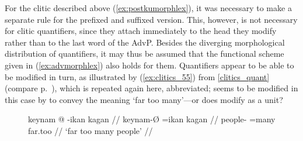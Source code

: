 For the clitic  described above (\ref{ex:postkumorphlex}),
it was necessary to make a separate rule for the prefixed and suffixed version.
This, however, is not necessary for clitic quantifiers, since they attach
immediately to the head they modify rather than to the last word of the AdvP.
Besides the diverging morphological distribution of quantifiers, it may thus be
assumed that the functional scheme given in (\ref{ex:advmorphlex}) also holds
for them. Quantifiers appear to be able to be modified in turn, as illustrated
by (\ref{ex:clitics_55}) from \autoref{clitics_quant} (compare
p.~\pageref{ex:clitics_55}), which is repeated again here, abbreviated;
 seems to be modified in this case by
 to convey the meaning `far too many'---or does
 modify  as a unit?

\begin{figure}[h]
\ex\label{ex:clitics_55_short}%
\begingl
	\gla keynam @ -ikan kagan //
	\glb keynam-Ø =ikan kagan //
	\glc people-\Top{} =many far.too //
	\glft `far too many people' //
\endgl%



\xe
\end{figure}

